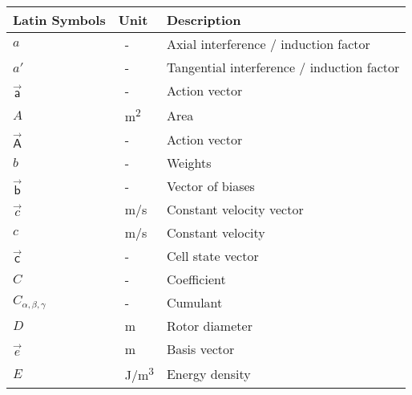 \begin{longtable}{p{5cm}p{4cm}p{5cm}}
	Latin Symbols 			& Unit      	& Description      \\ \hline
	$a$						& \SI{}{-}		& Axial interference / induction factor \\
	$a'$					& \SI{}{-}		& Tangential interference / induction factor \\
	$\vec{\mathsf{a}}$		& \SI{}{-}		& Action vector \\
	$A$						& \SI{}{m^2}	& Area \\
	$\vec{\mathsf{A}}$		& \SI{}{-}		& Action vector \\
	$b$						& \SI{}{-}		& Weights \\
	$\vec{\mathsf{b}}$		& \SI{}{-}		& Vector of biases \\
    $\vec{c}$               & \SI{}{m/s}    & Constant velocity vector \\
    $c$                     & \SI{}{m/s}    & Constant velocity \\
   	$\vec{\mathsf{c}}$		& \SI{}{-}		& Cell state vector \\
    $C$						& \SI{}{-}		& Coefficient \\
    $C_{\alpha, \beta, \gamma}$& \SI{}{-}	& Cumulant \\
    $D$						& \SI{}{m}		& Rotor diameter \\
    $\vec{e}$				& \SI{}{m}		& Basis vector \\
    $E$                     & \SI{}{J/m^3}  & Energy density \\

\end{longtable}
